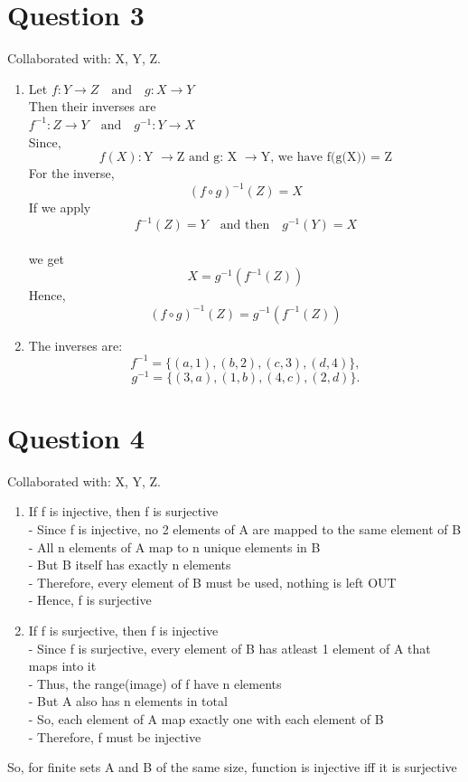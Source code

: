 \documentclass[twoside]{article}
\begin{document}
\newpage

\section*{Question 3}
Collaborated with: X, Y, Z.
\begin{enumerate}
    \item[(i)] 
    Let $f: Y \rightarrow Z \quad \text{and} \quad g: X \rightarrow Y $ \\
    Then their inverses are \\
    $f^{-1}: Z \rightarrow Y \quad \text{and} \quad g^{-1}: Y \rightarrow X $ \\
    Since,
    \[f(X) : \text{Y }\rightarrow \text{Z and g: X } \rightarrow \text{Y, we have f(g(X)) = Z}\]
    For the inverse, 
    \[(f \circ g)^{-1}(Z) = X\] 
    If we apply 
    \[f^{-1}(Z) = Y \quad \text{and then} \quad g^{-1}(Y) = X\] \\
    we get 
    \[X = g^{-1}(f^{-1}(Z))\]
    Hence, 
    \[(f \circ g)^{-1}(Z) = g^{-1}(f^{-1}(Z)) \]

    \item[(ii)] 
    The inverses are:
    \[f^{-1} = \{(a,1), (b,2), (c,3), (d,4)\},\]
    \[g^{-1} = \{(3,a), (1,b), (4,c), (2,d)\}.\]
\end{enumerate}

\section*{Question 4}
Collaborated with: X, Y, Z.
\begin{enumerate}
    \item[Case 1: ] If f is injective, then f is surjective \\
                    - Since f is injective, no 2 elements of A are mapped to the same element of B \\
                    - All n elements of A map to n unique elements in B \\
                    - But B itself has exactly n elements \\
                    - Therefore, every element of B must be used, nothing is left OUT \\
                    - Hence, f is surjective
    
    \item[Case 2: ] If f is surjective, then f is injective \\
                    - Since f is surjective, every element of B has atleast 1 element of A that maps into it \\
                    - Thus, the range(image) of f have n elements \\
                    - But A also has n elements in total \\
                    - So, each element of A map exactly one with each element of B \\
                    - Therefore, f must be injective
\end{enumerate}
So, for finite sets A and B of the same size, function is injective iff it is surjective
\end{document}
